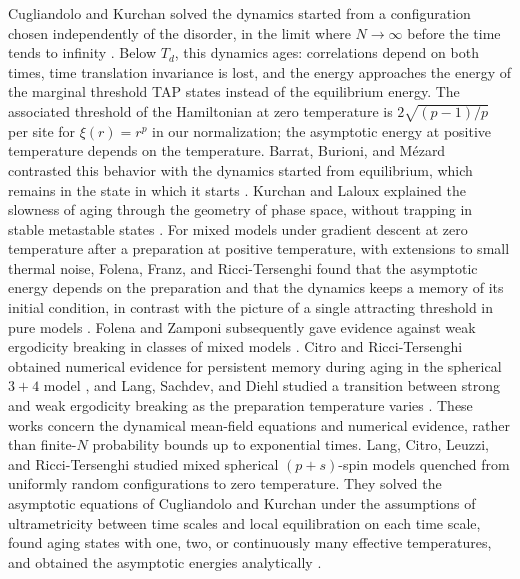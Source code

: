 Cugliandolo and Kurchan solved the dynamics started from a configuration chosen independently of the disorder, in the limit where $N\to\infty$ before the time tends to infinity \cite{CugliandoloKurchan1993}. Below $T_d$, this dynamics ages: correlations depend on both times, time translation invariance is lost, and the energy approaches the energy of the marginal threshold TAP states instead of the equilibrium energy. The associated threshold of the Hamiltonian at zero temperature is $2\sqrt{(p-1)/p}$ per site for $\xi(r)=r^p$ in our normalization; the asymptotic energy at positive temperature depends on the temperature. Barrat, Burioni, and M\'ezard contrasted this behavior with the dynamics started from equilibrium, which remains in the state in which it starts \cite{BarratBurioniMezard1996}. Kurchan and Laloux explained the slowness of aging through the geometry of phase space, without trapping in stable metastable states \cite{KurchanLaloux1996}. For mixed models under gradient descent at zero temperature after a preparation at positive temperature, with extensions to small thermal noise, Folena, Franz, and Ricci-Tersenghi found that the asymptotic energy depends on the preparation and that the dynamics keeps a memory of its initial condition, in contrast with the picture of a single attracting threshold in pure models \cite{FolenaFranzRicciTersenghi2020}. Folena and Zamponi subsequently gave evidence against weak ergodicity breaking in classes of mixed models \cite{FolenaZamponi2023}. Citro and Ricci-Tersenghi obtained numerical evidence for persistent memory during aging in the spherical $3+4$ model \cite{CitroRicciTersenghi2025}, and Lang, Sachdev, and Diehl studied a transition between strong and weak ergodicity breaking as the preparation temperature varies \cite{LangSachdevDiehl2025}. These works concern the dynamical mean-field equations and numerical evidence, rather than finite-$N$ probability bounds up to exponential times. Lang, Citro, Leuzzi, and Ricci-Tersenghi studied mixed spherical $(p+s)$-spin models quenched from uniformly random configurations to zero temperature. They solved the asymptotic equations of Cugliandolo and Kurchan under the assumptions of ultrametricity between time scales and local equilibration on each time scale, found aging states with one, two, or continuously many effective temperatures, and obtained the asymptotic energies analytically \cite{LangCitroLeuzziRicciTersenghi2026}.

